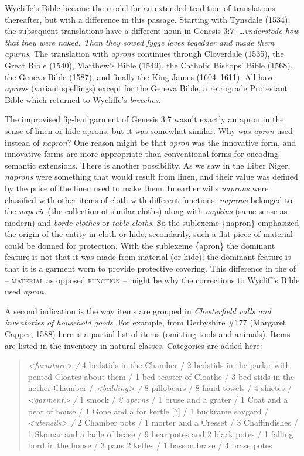 \documentclass[output=paper,
modfonts
]{LSP/langsci}
\begin{document}
\largerpage
Wycliffe's Bible became the model for an extended tradition of 
translations thereafter, but with a difference in this passage. Starting
with Tynsdale (1534), the subsequent translations have a different noun
in Genesis 3:7: \ldots{}\emph{vnderstode how that they were naked. Than
they sowed fygge leves togedder and made them apurns}. The translation
with \emph{aprons} continues through Cloverdale (1535), the Great Bible
(1540), Matthew's Bible (1549), the Catholic Bishops' Bible (1568), the
Geneva Bible (1587), and finally the King James (1604--1611). All have
\emph{aprons} (variant spellings) except for the Geneva Bible, a
retrograde Protestant Bible which returned to Wycliffe's
\emph{breeches}.


The improvised fig-leaf garment of Genesis 3:7 wasn't exactly an apron
in the sense of linen or hide aprons, but it was somewhat similar. Why
was \emph{apron} used instead of \emph{napron}? One reason might be that
\emph{apron} was the innovative form, and innovative forms are more
appropriate than conventional forms for encoding semantic extensions.
There is another possibility. As we saw in the Liber Niger,
\emph{naprons} were something that would result from linen, and their
value was defined by the price of the linen used to make them. In
earlier wills \emph{naprons} were classified with other items of cloth
with different functions; \emph{naprons} belonged to the \emph{naperie}
(the collection of similar cloths) along with \emph{napkins} (same sense
as modern) and \emph{borde clothes} or \emph{table cloths}. So the
sublexeme \{napron\} emphasized the origin of the entity in cloth or
hide; secondarily, such a flat piece of material could be donned for
protection. With the sublexeme \{apron\} the dominant feature is not
that it was made from material (or hide); the dominant feature is that it is
a garment worn to provide protective covering. This difference in the
 of  -- \textsc{material} as opposed
\textsc{function} -- might be why the corrections to Wycliff's Bible used
\emph{apron.}

\largerpage
A second indication is the way items are grouped in \emph{Chesterfield wills and inventories of
household goods}. For example, from
Derbyshire \#177 (Margaret Capper, 1588) here is a partial list of items
(omitting tools and animals). Items are listed in the inventory in
natural classes. Categories are added here:

\begin{quote}
\emph{\textless{}furniture\textgreater{} /} 4 bedstids in the Chamber /
2 bedstids in the parlar with pented Cloates about them / 1 bed teaster
of Cloathe / 3 bed stids in the nether Chamber /
\emph{\textless{}bedding\textgreater{} /} 8 pillobears / 8 hand towels /
4 shietes / \emph{\textless{}garment\textgreater{} /} 1 smock / \emph{2
aperns} / 1 bruse and a grater / 1 Coat and a pear of house / 1 Gone and
a for kertle {[}?{]} / 1 buckrame savgard /
\emph{\textless{}utensils\textgreater{} /} 2 Chamber pots / 1 morter and
a Cresset / 3 Chaffindishes / 1 Skomar and a ladle of brase / 9 bear
potes and 2 black potes / 1 falling bord in the house / 3 pans 2 ketles
/ 1 basson brase / 4 brase potes
\end{quote}
\end{document}
